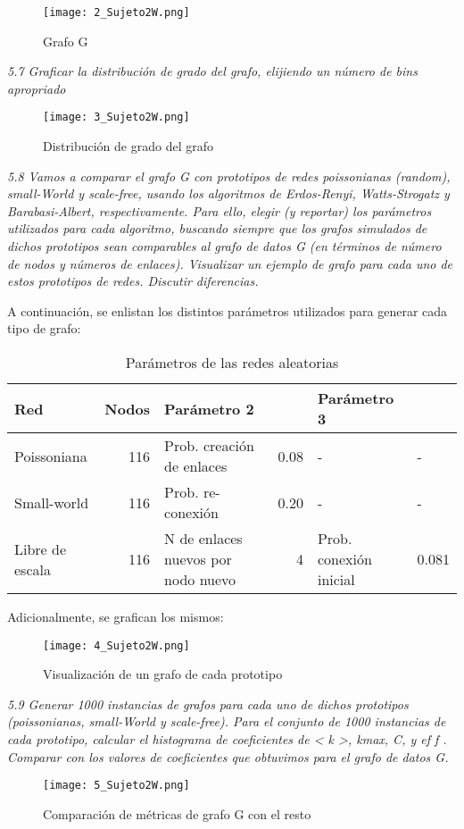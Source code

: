 \documentclass{article}
\begin{document}
\begin{figure}[H]
  \centering  
  \texttt{[image: 2\_Sujeto2W.png]}
  \caption{Grafo G}
\end{figure}

\textit{5.7 Graﬁcar la distribución de grado del grafo, elijiendo un número de bins apropriado}

\begin{figure}[H]
  \centering  
  \texttt{[image: 3\_Sujeto2W.png]}
  \caption{Distribución de grado del grafo}
\end{figure}

\textit{5.8 Vamos a comparar el grafo G con prototipos de redes poissonianas (random), small-World
 y scale-free, usando los algoritmos de Erdos-Renyi, Watts-Strogatz y Barabasi-Albert, respectivamente.
 Para ello, elegir (y reportar) los parámetros utilizados para cada algoritmo, 
buscando siempre que los grafos simulados de dichos prototipos sean comparables al grafo de datos G 
(en términos de número de nodos y números de enlaces). Visualizar un ejemplo de grafo para cada uno de 
estos prototipos de redes. Discutir diferencias.}

A continuación, se enlistan los distintos parámetros utilizados para generar cada tipo
de grafo:

\begin{table}[h]
  \caption{Parámetros de las redes aleatorias}
  \begin{tabular}{lrlrll}
  \toprule
  Red & Nodos & Parámetro 2 &  & Parámetro 3 &  \\
  \midrule
  Poissoniana & 116 & Prob. creación de enlaces & 0.08 & - & - \\
  Small-world & 116 & Prob. re-conexión & 0.20 & - & - \\
  Libre de escala & 116 & N de enlaces nuevos por nodo nuevo & 4 & Prob. conexión inicial & 0.081 \\
  \bottomrule
  \end{tabular}
  \end{table}

Adicionalmente, se grafican los mismos:

\begin{figure}[H]
  \centering  
  \texttt{[image: 4\_Sujeto2W.png]}
  \caption{Visualización de un grafo de cada prototipo}
\end{figure}


\textit{5.9 Generar 1000 instancias de grafos para cada uno de dichos prototipos (poissonianas,
small-World y scale-free). Para el conjunto de 1000 instancias de cada prototipo, calcular el histograma de coeﬁcientes de < k >, kmax, C, y ef f . Comparar con los valores
de coeﬁcientes que obtuvimos para el grafo de datos G.}

\begin{figure}[H]
  \centering  
  \texttt{[image: 5\_Sujeto2W.png]}
  \caption{Comparación de métricas de grafo G con el resto}
\end{figure}

\end{document}
